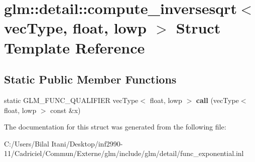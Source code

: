 \hypertarget{structglm_1_1detail_1_1compute__inversesqrt_3_01vec_type_00_01float_00_01lowp_01_4}{}\section{glm\+:\+:detail\+:\+:compute\+\_\+inversesqrt$<$ vec\+Type, float, lowp $>$ Struct Template Reference}
\label{structglm_1_1detail_1_1compute__inversesqrt_3_01vec_type_00_01float_00_01lowp_01_4}
\subsection*{Static Public Member Functions}
\begin{DoxyCompactItemize}
\item 
static G\+L\+M\+\_\+\+F\+U\+N\+C\+\_\+\+Q\+U\+A\+L\+I\+F\+I\+ER vec\+Type$<$ float, lowp $>$ {\bfseries call} (vec\+Type$<$ float, lowp $>$ const \&x)\hypertarget{structglm_1_1detail_1_1compute__inversesqrt_3_01vec_type_00_01float_00_01lowp_01_4_a943fd9690f6c1fcb7383bfbcde30c3fb}{}\label{structglm_1_1detail_1_1compute__inversesqrt_3_01vec_type_00_01float_00_01lowp_01_4_a943fd9690f6c1fcb7383bfbcde30c3fb}

\end{DoxyCompactItemize}


The documentation for this struct was generated from the following file\+:\begin{DoxyCompactItemize}
\item 
C\+:/\+Users/\+Bilal Itani/\+Desktop/inf2990-\/11/\+Cadriciel/\+Commun/\+Externe/glm/include/glm/detail/func\+\_\+exponential.\+inl\end{DoxyCompactItemize}
